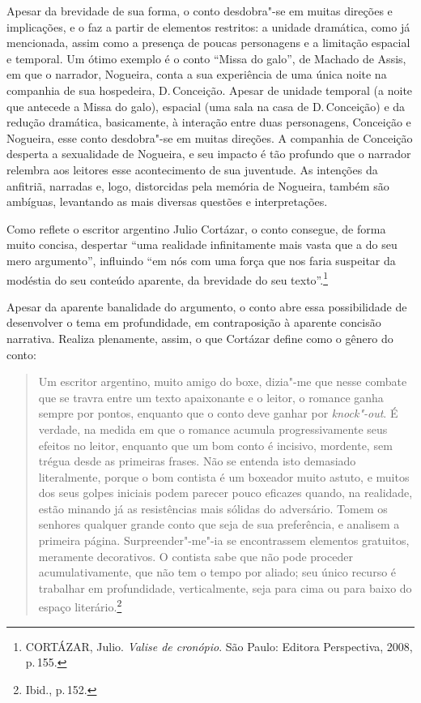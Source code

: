 Apesar da brevidade de sua forma, o conto desdobra"-se em muitas direções e implicações, e o faz a partir de elementos restritos: a unidade dramática, como já mencionada, assim como a presença de poucas personagens e a limitação espacial e temporal. Um ótimo exemplo é o conto ``Missa do galo'', de Machado de Assis, em que o narrador, Nogueira, conta a sua experiência de uma única noite na companhia de sua hospedeira, D.\,Conceição. Apesar de unidade temporal (a noite que antecede a Missa do galo), espacial (uma sala na casa de D.\,Conceição) e da redução dramática, basicamente, à interação entre duas personagens, Conceição e Nogueira, esse conto desdobra"-se em muitas direções. A companhia de Conceição desperta a sexualidade de Nogueira, e seu impacto é tão profundo que o narrador relembra aos leitores esse acontecimento de sua juventude. As intenções da anfitriã, narradas e, logo, distorcidas pela memória de Nogueira, também são ambíguas, levantando as mais diversas questões e interpretações.

Como reflete o escritor argentino Julio Cortázar, o conto consegue, de forma muito concisa, despertar ``uma realidade infinitamente mais vasta que a do seu mero argumento'', influindo ``em nós com uma força que nos faria suspeitar da modéstia do seu conteúdo aparente, da brevidade do seu texto''.\footnote{\textsc{CORTÁZAR}, Julio. \textit{Valise de cronópio}. São Paulo: Editora Perspectiva, 2008, p.\,155.}

Apesar da aparente banalidade do argumento, o conto abre essa possibilidade de desenvolver o tema em profundidade, em contraposição à aparente concisão narrativa. Realiza plenamente, assim, o que Cortázar define como o gênero do conto:

\begin{quote}
Um escritor argentino, muito amigo do boxe, dizia"-me que nesse combate que se travra entre um texto apaixonante e o leitor, o romance ganha sempre por pontos, enquanto que o conto deve ganhar por \textit{knock"-out}. É verdade, na medida em que o romance acumula progressivamente seus efeitos no leitor, enquanto que um bom conto é incisivo, mordente, sem trégua desde as primeiras frases. Não se entenda isto demasiado literalmente, porque o bom contista é um boxeador muito astuto, e muitos dos seus golpes iniciais podem parecer pouco eficazes quando, na realidade, estão minando já as resistências mais sólidas do adversário.
Tomem os senhores qualquer grande conto que seja de sua preferência, e analisem a primeira página. Surpreender"-me"-ia se encontrassem elementos gratuitos, meramente decorativos. O contista sabe que não pode proceder acumulativamente, que não tem o tempo por aliado; seu único recurso é trabalhar em profundidade, verticalmente, seja para cima ou para baixo do espaço literário.\footnote{Ibid., p.\,152.}
\end{quote}

